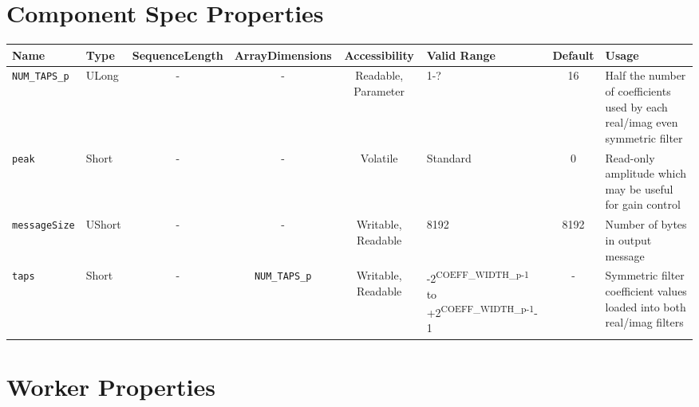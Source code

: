 \begin{landscape}
	\section*{Component Spec Properties}
	\begin{scriptsize}
		\begin{tabular}{|p{1.5cm}|p{1cm}|c|c|c|p{3cm}|c|p{7cm}|}
			\hline
			\rowcolor{blue}
			Name               & Type   & SequenceLength & ArrayDimensions   & Accessibility       & Valid Range                                                                      & Default & Usage                                                                        \\
			\hline
			\verb+NUM_TAPS_p+  & ULong  & -              & -                 & Readable, Parameter & 1-?                                                                              & 16      & Half the number of coefficients used by each real/imag even symmetric filter \\
			\hline
			\verb+peak+        & Short  & -              & -                 & Volatile            & Standard                                                                         & 0       & Read-only amplitude which may be useful for gain control                     \\
			\hline
			\verb+messageSize+ & UShort & -              & -                 & Writable, Readable  & 8192                                                                             & 8192    & Number of bytes in output message                                            \\
			\hline
			\verb+taps+        & Short  & -              & \verb+NUM_TAPS_p+ & Writable, Readable  & -2\textsuperscript{COEFF\_WIDTH\_p-1} to +2\textsuperscript{COEFF\_WIDTH\_p-1}-1 & -       & Symmetric filter coefficient values loaded into both real/imag filters       \\
			\hline
		\end{tabular}
	\end{scriptsize}

	\section*{Worker Properties}

\end{landscape}
